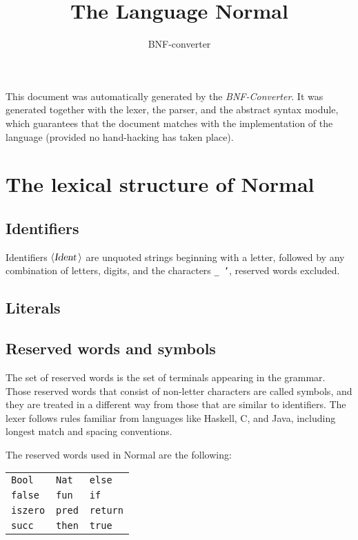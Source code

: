 \documentclass[a4paper,11pt]{article}
\title{The Language Normal}
\author{BNF-converter}
\begin{document}
\maketitle


\newcommand{\emptyP}{\mbox{$\epsilon$}}
\newcommand{\terminal}[1]{\mbox{{\texttt {#1}}}}
\newcommand{\nonterminal}[1]{\mbox{$\langle \mbox{{\sl #1 }} \! \rangle$}}
\newcommand{\arrow}{\mbox{::=}}
\newcommand{\delimit}{\mbox{$|$}}
\newcommand{\reserved}[1]{\mbox{{\texttt {#1}}}}
\newcommand{\literal}[1]{\mbox{{\texttt {#1}}}}
\newcommand{\symb}[1]{\mbox{{\texttt {#1}}}}

This document was automatically generated by the {\em BNF-Converter}.
It was generated together with the lexer, the parser, and the
abstract syntax module, which guarantees that the document
matches with the implementation of the language
(provided no hand-hacking has taken place).

\section*{The lexical structure of Normal}

\subsection*{Identifiers}
Identifiers \nonterminal{Ident} are unquoted strings beginning with a letter,
followed by any combination of letters, digits, and the characters {\tt \_ '},
reserved words excluded.
\subsection*{Literals}

\subsection*{Reserved words and symbols}
The set of reserved words is the set of terminals appearing in the grammar. Those reserved words that consist of non-letter characters are called symbols, and they are treated in a different way from those that are similar to identifiers. The lexer follows rules familiar from languages like Haskell, C, and Java, including longest match and spacing conventions.

The reserved words used in Normal are the following: \\

\begin{tabular}{lll}
{\reserved{Bool}} &{\reserved{Nat}} &{\reserved{else}} \\
{\reserved{false}} &{\reserved{fun}} &{\reserved{if}} \\
{\reserved{iszero}} &{\reserved{pred}} &{\reserved{return}} \\
{\reserved{succ}} &{\reserved{then}} &{\reserved{true}} \\
\end{tabular}\\
\end{document}
